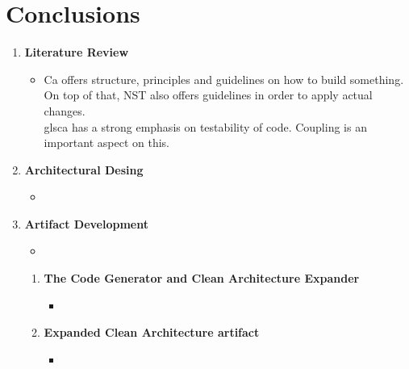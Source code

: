 \chapter{Conclusions} \label{chap_conclusions}




\begin{enumerate}
    \item \textbf{Literature Review} \\
    \begin{itemize}
        \item Ca offers structure, principles and guidelines on how to build something. On top
        of that, NST also offers guidelines in order to apply actual changes.
        \\gls{ca} has a strong emphasis on testability of code. Coupling is an important
        aspect on this.
    \end{itemize}
    
    \item \textbf{Architectural Desing} \\
    \begin{itemize}
        \item 
    \end{itemize}

    \item \textbf{Artifact Development} \\
    \begin{itemize}
        \item 
    \end{itemize}
    \begin{enumerate}[label*={\arabic*.}]
        
        \item \textbf{The Code Generator and Clean Architecture Expander} \\
        \begin{itemize}
            \item 
        \end{itemize}
        
        \item \textbf{Expanded Clean Architecture artifact} \\
        \begin{itemize}
            \item 
        \end{itemize}
        
    \end{enumerate}
    

\end{enumerate}
